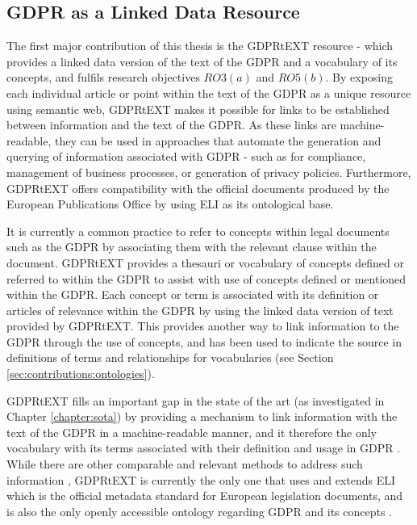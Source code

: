 \subsection{GDPR as a Linked Data Resource}
The first major contribution of this thesis is the GDPRtEXT resource - which provides a linked data version of the text of the GDPR and a vocabulary of its concepts, and fulfils research objectives $RO3(a)$ and $RO5(b)$. By exposing each individual article or point within the text of the GDPR as a unique resource using semantic web, GDPRtEXT makes it possible for links to be established between information and the text of the GDPR. As these links are machine-readable, they can be used in approaches that automate the generation and querying of information associated with GDPR - such as for compliance, management of business processes, or generation of privacy policies. Furthermore, GDPRtEXT offers compatibility with the official documents produced by the European Publications Office by using ELI as its ontological base.

It is currently a common practice to refer to concepts within legal documents such as the GDPR by associating them with the relevant clause within the document. 
GDPRtEXT provides a thesauri or vocabulary of concepts defined or referred to within the GDPR to assist with use of concepts defined or mentioned within the GDPR. Each concept or term is associated with its definition or articles of relevance within the GDPR by using the linked data version of text provided by GDPRtEXT. This provides another way to link information to the GDPR through the use of concepts, and has been used to indicate the source in definitions of terms and relationships for vocabularies (see Section \ref{sec:contributions:ontologies}).

GDPRtEXT fills an important gap in the state of the art (as investigated in Chapter \ref{chapter:sota}) by providing a mechanism to link information with the text of the GDPR in a machine-readable manner, and it therefore the only vocabulary with its terms associated with their definition and usage in GDPR .
While there are other comparable and relevant methods to address such information \cite{agarwal_legislative_2018,palmirani_pronto:_2018-1}, GDPRtEXT is currently the only one  that uses and extends ELI \cite{noauthor_council_2012} which is the official metadata standard for European legislation documents, and is also the only openly accessible ontology regarding GDPR and its concepts \cite{leone_taking_2019}.

